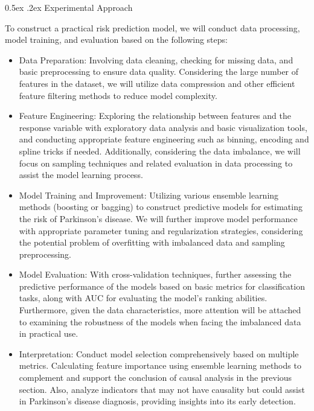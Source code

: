 \documentclass[12pt,]{article}
\makeatletter
\renewcommand\subsubsection{
  \@startsection{subsubsection}{3}{\z@}
    {-1.0ex\@plus -1ex \@minus -.2ex}%
    {0.5ex \@plus .2ex}%
    {\normalfont\normalsize\bf}} %
\makeatother
\begin{document}
\hypertarget{experimental-approach-1}{%
\subsubsection{Experimental Approach}\label{experimental-approach-1}}

To construct a practical risk prediction model, we will conduct data
processing, model training, and evaluation based on the following steps:

\begin{itemize}
\item
  Data Preparation: Involving data cleaning, checking for missing data,
  and basic preprocessing to ensure data quality. Considering the large
  number of features in the dataset, we will utilize data compression
  and other efficient feature filtering methods to reduce model
  complexity.
\item
  Feature Engineering: Exploring the relationship between features and
  the response variable with exploratory data analysis and basic
  visualization tools, and conducting appropriate feature engineering
  such as binning, encoding and spline tricks if needed. Additionally,
  considering the data imbalance, we will focus on sampling techniques
  and related evaluation in data processing to assist the model learning
  process.
\item
  Model Training and Improvement: Utilizing various ensemble learning
  methods (boosting or bagging) to construct predictive models for
  estimating the risk of Parkinson's disease. We will further improve
  model performance with appropriate parameter tuning and regularization
  strategies, considering the potential problem of overfitting with
  imbalanced data and sampling preprocessing.
\item
  Model Evaluation: With cross-validation techniques, further assessing
  the predictive performance of the models based on basic metrics for
  classification tasks, along with AUC for evaluating the model's
  ranking abilities. Furthermore, given the data characteristics, more
  attention will be attached to examining the robustness of the models
  when facing the imbalanced data in practical use.
\item
  Interpretation: Conduct model selection comprehensively based on
  multiple metrics. Calculating feature importance using ensemble
  learning methods to complement and support the conclusion of causal
  analysis in the previous section. Also, analyze indicators that may
  not have causality but could assist in Parkinson's disease diagnosis,
  providing insights into its early detection.
\end{itemize}
\end{document}
